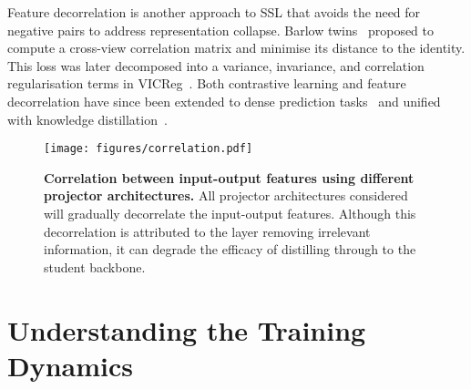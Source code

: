 \documentclass[letterpaper]{article} \usepackage[submission]{aaai23}  \usepackage{times}  \usepackage{helvet}  \usepackage{courier}  \usepackage[hyphens]{url}  \usepackage{graphicx} \urlstyle{rm} \def\UrlFont{\rm}  \usepackage{natbib}  \usepackage{caption} \frenchspacing  \setlength{\pdfpagewidth}{8.5in} \setlength{\pdfpageheight}{11in} \usepackage{algorithm}
\begin{document}
Feature decorrelation is another approach to SSL that avoids the need for negative pairs to address representation collapse. Barlow twins~\cite{Zbontar2021BarlowReduction} proposed to compute a cross-view correlation matrix and minimise its distance to the identity. This loss was later decomposed into a variance, invariance, and correlation regularisation terms in VICReg~\cite{Bardes2022VICReg:Learning}. Both contrastive learning and feature decorrelation have since been extended to dense prediction tasks~\cite{Bardes2022VICRegL:Features} and unified with knowledge distillation~\cite{Miles2023MobileVOS:Distillation}.

\begin{figure}
\centering
\texttt{[image: figures/correlation.pdf]}
\caption{\textbf{Correlation between input-output features using different projector architectures.} All projector architectures considered will gradually decorrelate the input-output features. Although this decorrelation is attributed to the layer removing irrelevant information, it can degrade the efficacy of distilling through to the student backbone.}
\label{fig:input_output_decorrelation}
\end{figure}

\section{Understanding the Training Dynamics}
\label{sec:understanding_kd}
\end{document}
